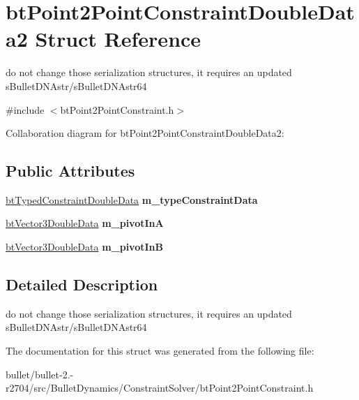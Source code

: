\hypertarget{structbt_point2_point_constraint_double_data2}{\section{bt\+Point2\+Point\+Constraint\+Double\+Data2 Struct Reference}
\label{structbt_point2_point_constraint_double_data2}
}


do not change those serialization structures, it requires an updated s\+Bullet\+D\+N\+Astr/s\+Bullet\+D\+N\+Astr64  




{\ttfamily \#include $<$bt\+Point2\+Point\+Constraint.\+h$>$}



Collaboration diagram for bt\+Point2\+Point\+Constraint\+Double\+Data2\+:
\subsection*{Public Attributes}
\begin{DoxyCompactItemize}
\item 
\hypertarget{structbt_point2_point_constraint_double_data2_abd3d478126f26324a414e60ade0e2c4c}{\hyperlink{structbt_typed_constraint_double_data}{bt\+Typed\+Constraint\+Double\+Data} {\bfseries m\+\_\+type\+Constraint\+Data}}\label{structbt_point2_point_constraint_double_data2_abd3d478126f26324a414e60ade0e2c4c}

\item 
\hypertarget{structbt_point2_point_constraint_double_data2_abd97c7547012d8e87ff8b0780c9c58a5}{\hyperlink{structbt_vector3_double_data}{bt\+Vector3\+Double\+Data} {\bfseries m\+\_\+pivot\+In\+A}}\label{structbt_point2_point_constraint_double_data2_abd97c7547012d8e87ff8b0780c9c58a5}

\item 
\hypertarget{structbt_point2_point_constraint_double_data2_a9cf5d886d95691c1ea36b48d4b80f2be}{\hyperlink{structbt_vector3_double_data}{bt\+Vector3\+Double\+Data} {\bfseries m\+\_\+pivot\+In\+B}}\label{structbt_point2_point_constraint_double_data2_a9cf5d886d95691c1ea36b48d4b80f2be}

\end{DoxyCompactItemize}


\subsection{Detailed Description}
do not change those serialization structures, it requires an updated s\+Bullet\+D\+N\+Astr/s\+Bullet\+D\+N\+Astr64 

The documentation for this struct was generated from the following file\+:\begin{DoxyCompactItemize}
\item 
bullet/bullet-\/2.-\/r2704/src/\+Bullet\+Dynamics/\+Constraint\+Solver/bt\+Point2\+Point\+Constraint.\+h\end{DoxyCompactItemize}
